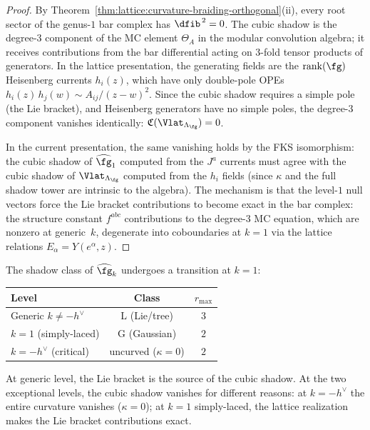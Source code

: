 \begin{proof}
By Theorem~\ref{thm:lattice:curvature-braiding-orthogonal}(ii),
every root sector of the genus-$1$ bar complex has
$\dfib^{\,2} = 0$. The cubic shadow is the degree-$3$
component of the MC element $\Theta_A$ in the modular
convolution algebra; it receives contributions from the
bar differential acting on $3$-fold tensor products of
generators. In the lattice presentation, the
generating fields are the $\operatorname{rank}(\fg)$ Heisenberg
currents $h_i(z)$, which have only double-pole OPEs
$h_i(z)\,h_j(w) \sim A_{ij}/(z-w)^2$. Since the cubic
shadow requires a simple pole (the Lie bracket), and
Heisenberg generators have no simple poles, the
degree-$3$ component vanishes identically:
$\mathfrak{C}(\Vlat_{\Lambda_\fg}) = 0$.

In the current presentation, the same vanishing holds by
the FKS isomorphism: the cubic shadow of $\widehat{\fg}_1$
computed from the $J^a$ currents must agree with the cubic
shadow of $\Vlat_{\Lambda_\fg}$ computed from the $h_i$
fields (since $\kappa$ and the full shadow tower are
intrinsic to the algebra). The mechanism is that the
level-$1$ null vectors force the Lie bracket contributions
to become exact in the bar complex: the structure constant
$f^{abc}$ contributions to the degree-$3$ MC equation, which
are nonzero at generic~$k$, degenerate into
coboundaries at $k = 1$ via the lattice relations
$E_\alpha = Y(e^\alpha, z)$.
\end{proof}

\begin{remark}[Classification transition at $k = 1$]%
\label{rem:level1-class-transition}%
The shadow class of $\widehat{\fg}_k$ undergoes a transition
at $k = 1$:
\begin{center}
\begin{tabular}{lcc}
\toprule
\textbf{Level} & \textbf{Class} & $r_{\max}$ \\
\midrule
Generic $k \neq -h^\vee$ & L (Lie/tree) & $3$ \\
$k = 1$ (simply-laced) & G (Gaussian) & $2$ \\
$k = -h^\vee$ (critical) & uncurved ($\kappa = 0$) & $2$ \\
\bottomrule
\end{tabular}
\end{center}
At generic level, the Lie bracket is the source of the cubic
shadow. At the two exceptional levels, the cubic shadow
vanishes for different reasons: at $k = -h^\vee$ the entire
curvature vanishes ($\kappa = 0$);
at $k = 1$ simply-laced, the lattice realization makes the
Lie bracket contributions exact.
\end{remark}



